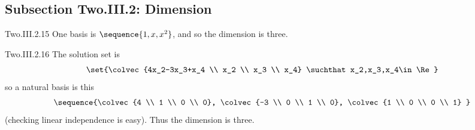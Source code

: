 \subsection{Subsection Two.III.2: Dimension}
\begin{ans}{Two.III.2.15}
      One basis is \( \sequence{1,x,x^2} \), and so
      the dimension is three.
    
\end{ans}
\begin{ans}{Two.III.2.16}
      The solution set is
      \begin{equation*}
        \set{\colvec{4x_2-3x_3+x_4 \\ x_2 \\ x_3 \\ x_4}
               \suchthat x_2,x_3,x_4\in\Re}
      \end{equation*}
      so a natural basis is this
      \begin{equation*}
       \sequence{\colvec{4 \\ 1 \\ 0 \\ 0},
                   \colvec{-3 \\ 0 \\ 1 \\ 0},
                   \colvec{1 \\ 0 \\ 0 \\ 1}  }
      \end{equation*}
      (checking linear independence is easy).
      Thus the dimension is three.
    
\end{ans}
